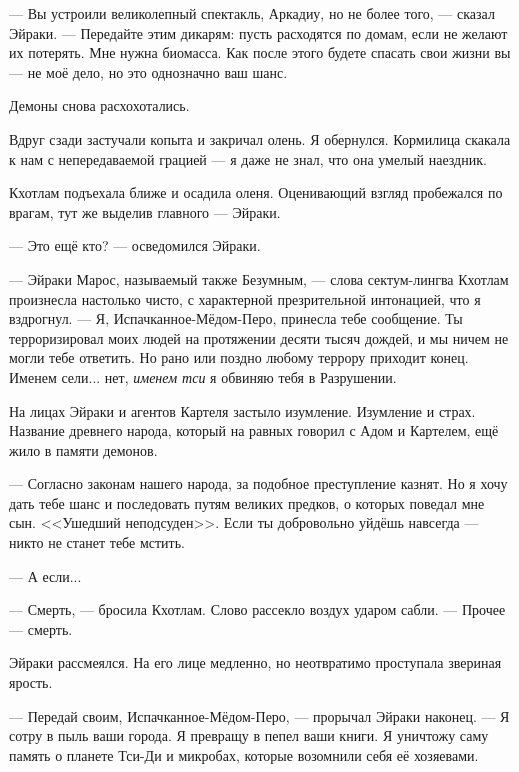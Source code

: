 --- Вы устроили великолепный спектакль, Аркадиу, но не более того, --- сказал Эйраки.
--- Передайте этим дикарям: пусть расходятся по домам, если не желают их потерять.
Мне нужна биомасса.
Как после этого будете спасать свои жизни вы --- не моё дело, но это однозначно ваш шанс.

Демоны снова расхохотались.

Вдруг сзади застучали копыта и закричал олень.
Я обернулся.
Кормилица скакала к нам с непередаваемой грацией --- я даже не знал, что она умелый наездник.

Кхотлам подъехала ближе и осадила оленя.
Оценивающий взгляд пробежался по врагам, тут же выделив главного --- Эйраки.

--- Это ещё кто? --- осведомился Эйраки.

--- Эйраки Марос, называемый также Безумным, --- слова сектум-лингва Кхотлам произнесла настолько чисто, с характерной презрительной интонацией, что я вздрогнул.
--- Я, Испачканное-Мёдом-Перо, принесла тебе сообщение.
Ты терроризировал моих людей на протяжении десяти тысяч дождей, и мы ничем не могли тебе ответить.
Но рано или поздно любому террору приходит конец.
Именем сели... нет, \emph{именем тси} я обвиняю тебя в Разрушении.

На лицах Эйраки и агентов Картеля застыло изумление.
Изумление и страх.
Название древнего народа, который на равных говорил с Адом и Картелем, ещё жило в памяти демонов.

--- Согласно законам нашего народа, за подобное преступление казнят.
Но я хочу дать тебе шанс и последовать путям великих предков, о которых поведал мне сын.
<<Ушедший неподсуден>>\FM.
Если ты добровольно уйдёшь навсегда --- никто не станет тебе мстить.

--- А если...

--- Смерть, --- бросила Кхотлам.
Слово рассекло воздух ударом сабли.
--- Прочее --- смерть.

Эйраки рассмеялся.
На его лице медленно, но неотвратимо проступала звериная ярость.

--- Передай своим, Испачканное-Мёдом-Перо, --- прорычал Эйраки наконец.
--- Я сотру в пыль ваши города.
Я превращу в пепел ваши книги.
Я уничтожу саму память о планете Тси-Ди и микробах, которые возомнили себя её хозяевами.

